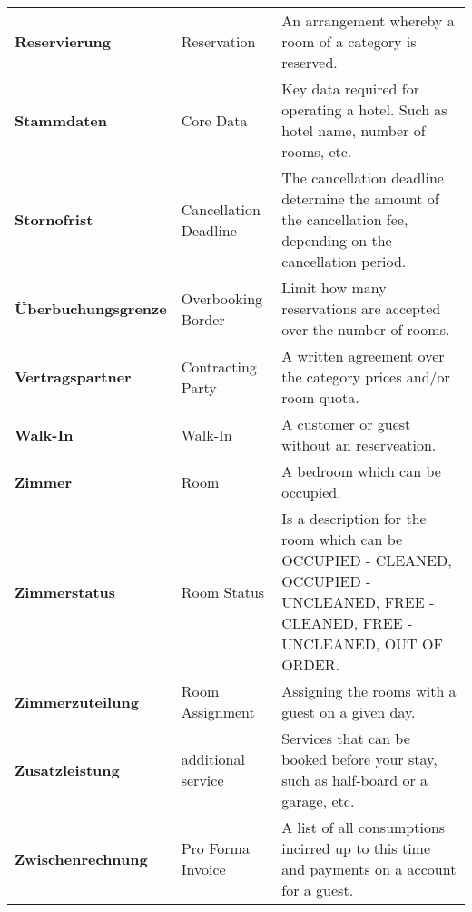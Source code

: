 \documentclass[../Pflichtenheft.tex]{subfiles}
\begin{document}
\begin{longtable}{p{4cm} p{4cm} p{6cm}}
        \textbf{Reservierung} & {Reservation} & An arrangement whereby a room of a category is reserved. \\[0.5cm]
        \textbf{Stammdaten} & {Core Data} & Key data required for operating a hotel. Such as hotel name, number of rooms, etc. \\[0.5cm]
        \textbf{Stornofrist} & {Cancellation Deadline} & The cancellation deadline determine the amount of the cancellation fee, depending on the cancellation period. \\[0.5cm]
        \textbf{Überbuchungsgrenze} & {Overbooking Border} & Limit how many reservations are accepted over the number of rooms. \\[0.5cm]
        \textbf{Vertragspartner} & {Contracting Party} & A written agreement over the category prices and/or room quota. \\[0.5cm]
        \textbf{Walk-In} & {Walk-In} & A customer or guest without an reserveation. \\[0.5cm]
        \textbf{Zimmer} & {Room} & A bedroom which can be occupied. \\[0.5cm]
        \textbf{Zimmerstatus} & {Room Status} & Is a description for the room which can be OCCUPIED - CLEANED, OCCUPIED - UNCLEANED, FREE - CLEANED, FREE - UNCLEANED, OUT OF ORDER. \\[0.5cm]
		\textbf{Zimmerzuteilung} & {Room Assignment} & Assigning the rooms with a guest on a given day. \\[0.5cm]
        \textbf{Zusatzleistung} & {additional service} & Services that can be booked before your stay, such as half-board or a garage, etc. \\[0.5cm]
        \textbf{Zwischenrechnung} & {Pro Forma Invoice} & A list of all consumptions incirred up to this time and payments on a account for a guest. \\[0.5cm]
		\end{longtable}
\end{document}
